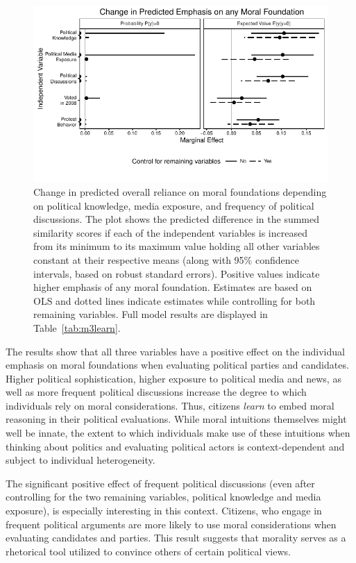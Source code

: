 \documentclass[12pt]{article}
\begin{document}
\begin{figure}[h]\centering
\includegraphics{../calc/fig/tobit_learn.pdf}
\caption{Change in predicted overall reliance on moral foundations depending on political knowledge, media exposure, and frequency of political discussions. The plot shows the predicted difference in the summed similarity scores if each of the independent variables is increased from its minimum to its maximum value holding all other variables constant at their respective means (along with 95\% confidence intervals, based on robust standard errors). Positive values indicate higher emphasis of any moral foundation. Estimates are based on OLS and dotted lines indicate estimates while controlling for both remaining variables. Full model results are displayed in Table~\ref{tab:m3learn}.}\label{fig:tobit_learn}
\end{figure}

The results show that all three variables have a positive effect on the individual emphasis on moral foundations when evaluating political parties and candidates. Higher political sophistication, higher exposure to political media and news, as well as more frequent political discussions increase the degree to which individuals rely on moral considerations. Thus, citizens \textit{learn} to embed moral reasoning in their political evaluations. While moral intuitions themselves might well be innate, the extent to which individuals make use of these intuitions when thinking about politics and evaluating political actors is context-dependent and subject to individual heterogeneity.

The significant positive effect of frequent political discussions (even after controlling for the two remaining variables, political knowledge and media exposure), is especially interesting in this context. Citizens, who engage in frequent political arguments are more likely to use moral considerations when evaluating candidates and parties. This result suggests that morality serves as a rhetorical tool utilized to convince others of certain political views.
\end{document}
